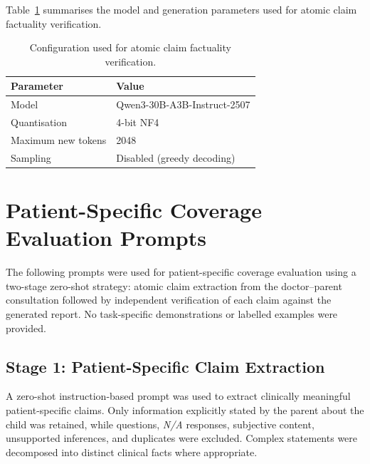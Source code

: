 \documentclass[ %
                    author={Aman Kumar Singh},
                supervisor={Dr. Edwin Simpson},
                    degree={MSc},
                     title={Quality-Aware Knowledge Distillation of Large Language Models for Efficient Personalised Clinical Report Generation},
                  subtitle={},
                      type={},
                      year={2021}]{dissertation}
\begin{document}
Table~\ref{tab:factuality_verification_config} summarises the model and generation parameters used for atomic claim factuality verification.


\begin{table}[htbp]
\centering
\caption{Configuration used for atomic claim factuality verification.}
\label{tab:factuality_verification_config}
\begin{tabular}{ll}
\hline
\textbf{Parameter} & \textbf{Value} \\
\hline
Model & Qwen3-30B-A3B-Instruct-2507 \\
Quantisation & 4-bit NF4 \\
Maximum new tokens & 2048 \\
Sampling & Disabled (greedy decoding) \\

\hline
\end{tabular}
\end{table}
\chapter{Patient-Specific Coverage Evaluation Prompts}
\label{appx:patient_coverage_prompt}

The following prompts were used for patient-specific coverage evaluation
using a two-stage zero-shot strategy: atomic claim extraction from the
doctor--parent consultation followed by independent verification of each
claim against the generated report. No task-specific demonstrations or
labelled examples were provided.


\section*{Stage 1: Patient-Specific Claim Extraction}

A zero-shot instruction-based prompt was used to extract clinically
meaningful patient-specific claims. Only information explicitly stated by
the parent about the child was retained, while questions, \textit{N/A}
responses, subjective content, unsupported inferences, and duplicates were
excluded. Complex statements were decomposed into distinct clinical facts
where appropriate.
\end{document}
